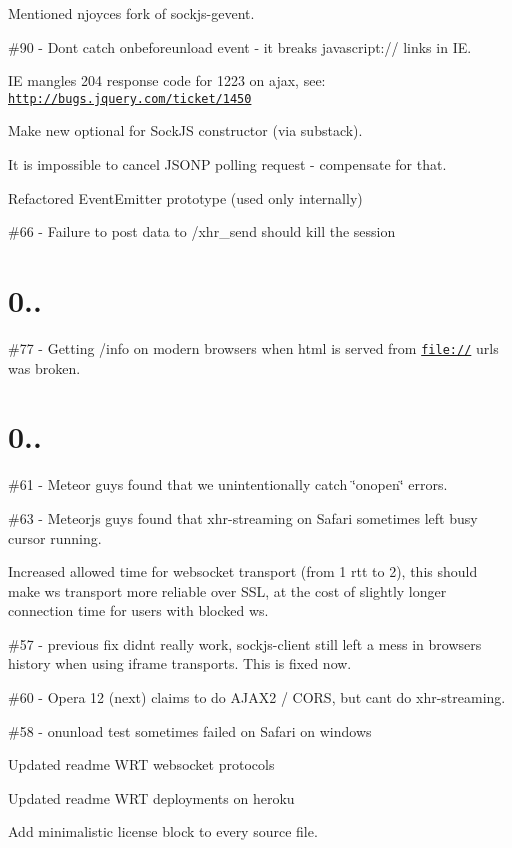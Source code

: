 \begin{DoxyItemize}
\item Mentioned njoyce\textquotesingle{}s fork of sockjs-\/gevent.
\item \#90 -\/ Don\textquotesingle{}t catch onbeforeunload event -\/ it breaks javascript\+:// links in IE.
\item IE mangles 204 response code for 1223 on ajax, see\+: \href{http://bugs.jquery.com/ticket/1450}{\tt http\+://bugs.\+jquery.\+com/ticket/1450}
\item Make {\ttfamily new} optional for Sock\+JS constructor (via substack).
\item It is impossible to cancel J\+S\+O\+NP polling request -\/ compensate for that.
\item Refactored Event\+Emitter prototype (used only internally)
\item \#66 -\/ Failure to post data to /xhr\+\_\+send should kill the session
\end{DoxyItemize}

\section*{0.. }


\begin{DoxyItemize}
\item \#77 -\/ Getting /info on modern browsers when html is served from \href{file://}{\tt file\+://} urls was broken.
\end{DoxyItemize}

\section*{0.. }


\begin{DoxyItemize}
\item \#61 -\/ Meteor guys found that we unintentionally catch \char`\"{}onopen\char`\"{} errors.
\item \#63 -\/ Meteorjs guys found that xhr-\/streaming on Safari sometimes left busy cursor running.
\item Increased allowed time for websocket transport (from 1 rtt to 2), this should make ws transport more reliable over S\+SL, at the cost of slightly longer connection time for users with blocked ws.
\item \#57 -\/ previous fix didn\textquotesingle{}t really work, sockjs-\/client still left a mess in browsers history when using iframe transports. This is fixed now.
\item \#60 -\/ Opera 12 (next) claims to do A\+J\+A\+X2 / C\+O\+RS, but can\textquotesingle{}t do xhr-\/streaming.
\item \#58 -\/ onunload test sometimes failed on Safari on windows
\item Updated readme W\+RT websocket protocols
\item Updated readme W\+RT deployments on heroku
\item Add minimalistic license block to every source file.
\end{DoxyItemize}

